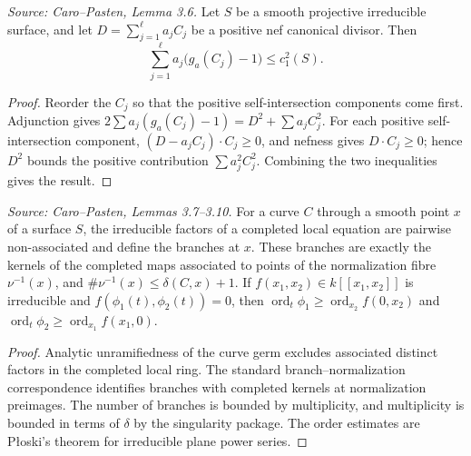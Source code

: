 \begin{lemma}
  \label{lem:cp_canonical_genus_bound}
  \textit{Source: Caro--Pasten, Lemma 3.6.}
  Let \(S\) be a smooth projective irreducible surface, and let
  \(D=\sum_{j=1}^{\ell}a_jC_j\) be a positive nef canonical divisor.  Then
  \[
    \sum_{j=1}^{\ell}a_j\bigl(g_a(C_j)-1\bigr)\le c_1^2(S).
  \]
\end{lemma}
\begin{proof}
  Reorder the \(C_j\) so that the positive self-intersection components come
  first.  Adjunction gives
  \(2\sum a_j(g_a(C_j)-1)=D^2+\sum a_j C_j^2\).  For each positive
  self-intersection component, \((D-a_jC_j)\cdot C_j\ge0\), and nefness gives
  \(D\cdot C_j\ge0\); hence \(D^2\) bounds the positive contribution
  \(\sum a_j^2 C_j^2\).  Combining the two inequalities gives the result.
\end{proof}

\begin{lemma}
  \label{lem:cp_branches_package}
  \textit{Source: Caro--Pasten, Lemmas 3.7--3.10.}
  For a curve \(C\) through a smooth point \(x\) of a surface \(S\), the
  irreducible factors of a completed local equation are pairwise
  non-associated and define the branches at \(x\).  These branches are exactly
  the kernels of the completed maps associated to points of the normalization
  fibre \(\nu^{-1}(x)\), and
  \(\#\nu^{-1}(x)\le\delta(C,x)+1\).  If
  \(f(x_1,x_2)\in k[[x_1,x_2]]\) is irreducible and
  \(f(\phi_1(t),\phi_2(t))=0\), then
  \(\operatorname{ord}_t\phi_1\ge\operatorname{ord}_{x_2}f(0,x_2)\) and
  \(\operatorname{ord}_t\phi_2\ge\operatorname{ord}_{x_1}f(x_1,0)\).
\end{lemma}
\begin{proof}
  Analytic unramifiedness of the curve germ excludes associated distinct
  factors in the completed local ring.  The standard branch--normalization
  correspondence identifies branches with completed kernels at normalization
  preimages.  The number of branches is bounded by multiplicity, and
  multiplicity is bounded in terms of \(\delta\) by the singularity package.
  The order estimates are Płoski's theorem for irreducible plane power series.
\end{proof}

